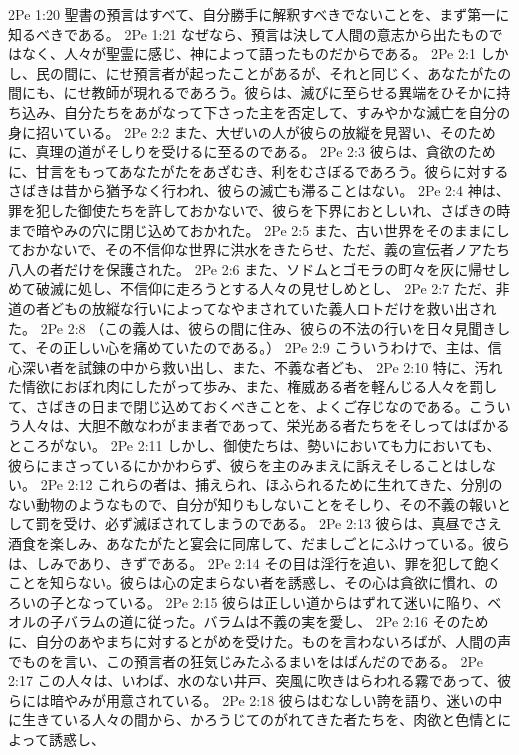 2Pe 1:20  聖書の預言はすべて、自分勝手に解釈すべきでないことを、まず第一に知るべきである。
2Pe 1:21  なぜなら、預言は決して人間の意志から出たものではなく、人々が聖霊に感じ、神によって語ったものだからである。
2Pe 2:1  しかし、民の間に、にせ預言者が起ったことがあるが、それと同じく、あなたがたの間にも、にせ教師が現れるであろう。彼らは、滅びに至らせる異端をひそかに持ち込み、自分たちをあがなって下さった主を否定して、すみやかな滅亡を自分の身に招いている。
2Pe 2:2  また、大ぜいの人が彼らの放縦を見習い、そのために、真理の道がそしりを受けるに至るのである。
2Pe 2:3  彼らは、貪欲のために、甘言をもってあなたがたをあざむき、利をむさぼるであろう。彼らに対するさばきは昔から猶予なく行われ、彼らの滅亡も滞ることはない。
2Pe 2:4  神は、罪を犯した御使たちを許しておかないで、彼らを下界におとしいれ、さばきの時まで暗やみの穴に閉じ込めておかれた。
2Pe 2:5  また、古い世界をそのままにしておかないで、その不信仰な世界に洪水をきたらせ、ただ、義の宣伝者ノアたち八人の者だけを保護された。
2Pe 2:6  また、ソドムとゴモラの町々を灰に帰せしめて破滅に処し、不信仰に走ろうとする人々の見せしめとし、
2Pe 2:7  ただ、非道の者どもの放縦な行いによってなやまされていた義人ロトだけを救い出された。
2Pe 2:8  （この義人は、彼らの間に住み、彼らの不法の行いを日々見聞きして、その正しい心を痛めていたのである。）
2Pe 2:9  こういうわけで、主は、信心深い者を試錬の中から救い出し、また、不義な者ども、
2Pe 2:10  特に、汚れた情欲におぼれ肉にしたがって歩み、また、権威ある者を軽んじる人々を罰して、さばきの日まで閉じ込めておくべきことを、よくご存じなのである。こういう人々は、大胆不敵なわがまま者であって、栄光ある者たちをそしってはばかるところがない。
2Pe 2:11  しかし、御使たちは、勢いにおいても力においても、彼らにまさっているにかかわらず、彼らを主のみまえに訴えそしることはしない。
2Pe 2:12  これらの者は、捕えられ、ほふられるために生れてきた、分別のない動物のようなもので、自分が知りもしないことをそしり、その不義の報いとして罰を受け、必ず滅ぼされてしまうのである。
2Pe 2:13  彼らは、真昼でさえ酒食を楽しみ、あなたがたと宴会に同席して、だましごとにふけっている。彼らは、しみであり、きずである。
2Pe 2:14  その目は淫行を追い、罪を犯して飽くことを知らない。彼らは心の定まらない者を誘惑し、その心は貪欲に慣れ、のろいの子となっている。
2Pe 2:15  彼らは正しい道からはずれて迷いに陥り、ベオルの子バラムの道に従った。バラムは不義の実を愛し、
2Pe 2:16  そのために、自分のあやまちに対するとがめを受けた。ものを言わないろばが、人間の声でものを言い、この預言者の狂気じみたふるまいをはばんだのである。
2Pe 2:17  この人々は、いわば、水のない井戸、突風に吹きはらわれる霧であって、彼らには暗やみが用意されている。
2Pe 2:18  彼らはむなしい誇を語り、迷いの中に生きている人々の間から、かろうじてのがれてきた者たちを、肉欲と色情とによって誘惑し、
